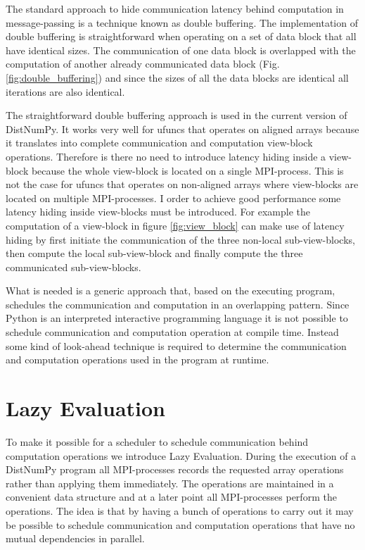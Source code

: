 \documentclass[preprint]{../PGAS10/sigplanconf}
\begin{document}
The standard approach to hide communication latency behind computation in message-passing is a technique known as double buffering. The implementation of double buffering is straightforward when operating on a set of data block that all have identical sizes. The communication of one data block is overlapped with the computation of another already communicated data block (Fig. \ref{fig:double_buffering}) and since the sizes of all the data blocks are identical all iterations are also identical.

The straightforward double buffering approach is used in the current version of DistNumPy. It works very well for ufuncs that operates on aligned arrays because it translates into complete communication and computation view-block operations. Therefore is there no need to introduce latency hiding inside a view-block because the whole view-block is located on a single MPI-process. This is not the case for ufuncs that operates on non-aligned arrays where view-blocks are located on multiple MPI-processes. I order to achieve good performance some latency hiding inside view-blocks must be introduced. For example the computation of a view-block in figure \ref{fig:view_block} can make use of latency hiding by first initiate the communication of the three non-local sub-view-blocks, then compute the local sub-view-block and finally compute the three communicated sub-view-blocks. 

What is needed is a generic approach that, based on the executing program, schedules the communication and computation in an overlapping pattern. Since Python is an interpreted interactive programming language it is not possible to schedule communication and computation operation at compile time. Instead some kind of look-ahead technique is required to determine the communication and computation operations used in the program at runtime. 


\section{Lazy Evaluation}
To make it possible for a scheduler to schedule communication behind computation operations we introduce Lazy Evaluation. During the execution of a DistNumPy program all MPI-processes records the requested array operations rather than applying them immediately. The operations are maintained in a convenient data structure and at a later point all MPI-processes perform the operations. The idea is that by having a bunch of operations to carry out it may be possible to schedule communication and computation operations that have no mutual dependencies in parallel.
\end{document}
